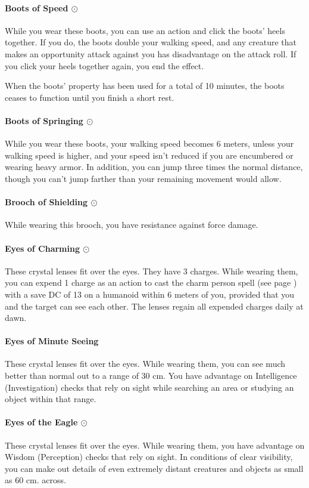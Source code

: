     \paragraph{Boots of Speed $\odot$}
        While you wear these boots, you can use an action and click the boots' heels together.
        If you do, the boots double your walking speed, and any creature that makes an opportunity attack against you has disadvantage on the attack roll.
        If you click your heels together again, you end the effect.

        When the boots' property has been used for a total of 10 minutes, the boots ceases to function until you finish a short rest.
    \paragraph{Boots of Springing $\odot$}
        While you wear these boots, your walking speed becomes 6 meters, unless your walking speed is higher, and your speed isn't reduced if you are encumbered or wearing heavy armor.
        In addition, you can jump three times the normal distance, though you can't jump farther than your remaining movement would allow.
    \paragraph{Brooch of Shielding $\odot$}
        While wearing this brooch, you have resistance against force damage.
    \paragraph{Eyes of Charming $\odot$}
        These crystal lenses fit over the eyes.
        They have 3 charges.
        While wearing them, you can expend 1 charge as an action to cast the charm person spell (see page \pageref{spell::charmperson}) with a save DC of 13 on a humanoid within 6 meters of you, provided that you and the target can see each other.
        The lenses regain all expended charges daily at dawn.
    \paragraph{Eyes of Minute Seeing}
        These crystal lenses fit over the eyes.
        While wearing them, you can see much better than normal out to a range of 30 cm.
        You have advantage on Intelligence (Investigation) checks that rely on sight while searching an area or studying an object within that range.
    \paragraph{Eyes of the Eagle $\odot$}
        These crystal lenses fit over the eyes.
        While wearing them, you have advantage on Wisdom (Perception) checks that rely on sight.
        In conditions of clear visibility, you can make out details of even extremely distant creatures and objects as small as 60 cm. across.
